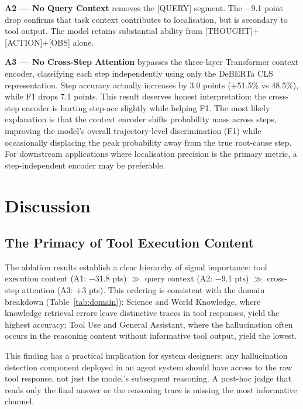 \documentclass[11pt]{article}
\begin{document}
\textbf{A2 — No Query Context} removes the [QUERY] segment. The $-$9.1 point drop confirms that task context contributes to localisation, but is secondary to tool output. The model retains substantial ability from [THOUGHT]+[ACTION]+[OBS] alone.

\textbf{A3 — No Cross-Step Attention} bypasses the three-layer Transformer context encoder, classifying each step independently using only the DeBERTa CLS representation. Step accuracy actually increases by 3.0 points (+51.5\% vs 48.5\%), while F1 drops 7.1 points. This result deserves honest interpretation: the cross-step encoder is hurting step-acc slightly while helping F1. The most likely explanation is that the context encoder shifts probability mass across steps, improving the model's overall trajectory-level discrimination (F1) while occasionally displacing the peak probability away from the true root-cause step. For downstream applications where localisation precision is the primary metric, a step-independent encoder may be preferable.

\section{Discussion}

\subsection{The Primacy of Tool Execution Content}

The ablation results establish a clear hierarchy of signal importance: tool execution content (A1: $-$31.8 pts) $\gg$ query context (A2: $-$9.1 pts) $\gg$ cross-step attention (A3: $+$3 pts). This ordering is consistent with the domain breakdown (Table~\ref{tab:domain}): Science and World Knowledge, where knowledge retrieval errors leave distinctive traces in tool responses, yield the highest accuracy; Tool Use and General Assistant, where the hallucination often occurs in the reasoning content without informative tool output, yield the lowest.

This finding has a practical implication for system designers: any hallucination detection component deployed in an agent system should have access to the raw tool response, not just the model's subsequent reasoning. A post-hoc judge that reads only the final answer or the reasoning trace is missing the most informative channel.
\end{document}
